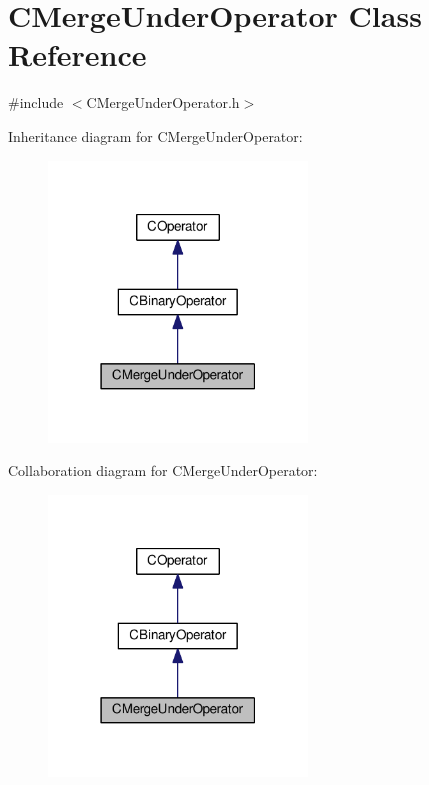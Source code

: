 \hypertarget{classCMergeUnderOperator}{}\section{C\+Merge\+Under\+Operator Class Reference}
\label{classCMergeUnderOperator}


{\ttfamily \#include $<$C\+Merge\+Under\+Operator.\+h$>$}



Inheritance diagram for C\+Merge\+Under\+Operator\+:\nopagebreak
\begin{figure}[H]
\begin{center}
\leavevmode
\includegraphics[width=195pt]{classCMergeUnderOperator__inherit__graph}
\end{center}
\end{figure}


Collaboration diagram for C\+Merge\+Under\+Operator\+:\nopagebreak
\begin{figure}[H]
\begin{center}
\leavevmode
\includegraphics[width=195pt]{classCMergeUnderOperator__coll__graph}
\end{center}
\end{figure}
